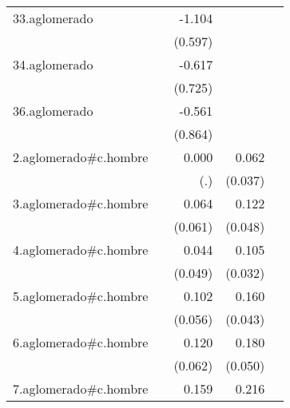 {\begin{longtable}{l*{4}{D{.}{.}{-1}}}
\addlinespace
33.aglomerado&                     &      -1.104         &                     &                     \\
            &                     &     (0.597)         &                     &                     \\
\addlinespace
34.aglomerado&                     &      -0.617         &                     &                     \\
            &                     &     (0.725)         &                     &                     \\
\addlinespace
36.aglomerado&                     &      -0.561         &                     &                     \\
            &                     &     (0.864)         &                     &                     \\
\addlinespace
2.aglomerado#c.hombre&                     &       0.000         &       0.062         &                     \\
            &                     &         (.)         &     (0.037)         &                     \\
\addlinespace
3.aglomerado#c.hombre&                     &       0.064         &       0.122\sym{*}  &                     \\
            &                     &     (0.061)         &     (0.048)         &                     \\
\addlinespace
4.aglomerado#c.hombre&                     &       0.044         &       0.105\sym{**} &                     \\
            &                     &     (0.049)         &     (0.032)         &                     \\
\addlinespace
5.aglomerado#c.hombre&                     &       0.102         &       0.160\sym{***}&                     \\
            &                     &     (0.056)         &     (0.043)         &                     \\
\addlinespace
6.aglomerado#c.hombre&                     &       0.120         &       0.180\sym{***}&                     \\
            &                     &     (0.062)         &     (0.050)         &                     \\
\addlinespace
7.aglomerado#c.hombre&                     &       0.159\sym{**} &       0.216\sym{***}&                     \\

\end{longtable}}
